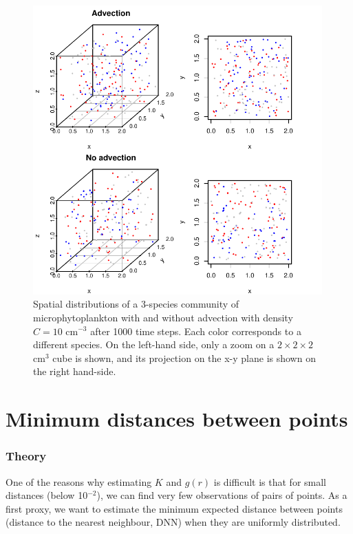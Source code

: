 \documentclass[english]{article}
\begin{document}
\begin{figure}[H]
\begin{centering}
\includegraphics[width=0.99\textwidth]{../code/figure/spatial_distribution_zoom_micro0}
\par\end{centering}
\caption{Spatial distributions of a 3-species community of microphytoplankton
with and without advection with density $C=10$ cm$^{-3}$ after 1000
time steps. Each color corresponds to a different species. On the
left-hand side, only a zoom on a $2\times2\times2$ cm$^{3}$ cube
is shown, and its projection on the x-y plane is shown on the right
hand-side. \label{fig:Spatial-distributions} }
\end{figure}


\section{Minimum distances between points}

\subsubsection*{Theory}

One of the reasons why estimating $K$ and $g(r)$ is difficult is
that for small distances (below 10$^{-2}$), we can find very few
observations of pairs of points. As a first proxy, we want to estimate
the minimum expected distance between points (distance to the nearest
neighbour, DNN) when they are uniformly distributed.
\end{document}
